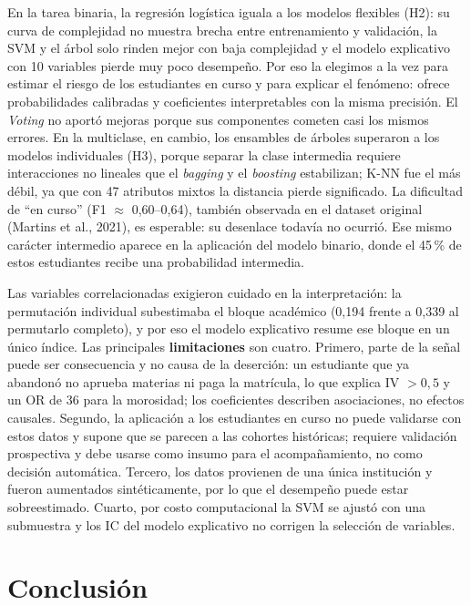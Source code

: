 \documentclass[titlepage,a4paper]{article}
\begin{document}
En la tarea binaria, la regresión logística iguala a los modelos flexibles (H2): su curva de complejidad no muestra brecha entre entrenamiento y validación, la SVM y el árbol solo rinden mejor con baja complejidad y el modelo explicativo con 10 variables pierde muy poco desempeño. Por eso la elegimos a la vez para estimar el riesgo de los estudiantes en curso y para explicar el fenómeno: ofrece probabilidades calibradas y coeficientes interpretables con la misma precisión. El \textit{Voting} no aportó mejoras porque sus componentes cometen casi los mismos errores. En la multiclase, en cambio, los ensambles de árboles superaron a los modelos individuales (H3), porque separar la clase intermedia requiere interacciones no lineales que el \textit{bagging} y el \textit{boosting} estabilizan; K-NN fue el más débil, ya que con 47 atributos mixtos la distancia pierde significado. La dificultad de ``en curso'' (F1 $\approx$ 0,60--0,64), también observada en el dataset original (Martins et al., 2021), es esperable: su desenlace todavía no ocurrió. Ese mismo carácter intermedio aparece en la aplicación del modelo binario, donde el 45\,\% de estos estudiantes recibe una probabilidad intermedia.

Las variables correlacionadas exigieron cuidado en la interpretación: la permutación individual subestimaba el bloque académico (0,194 frente a 0,339 al permutarlo completo), y por eso el modelo explicativo resume ese bloque en un único índice. Las principales \textbf{limitaciones} son cuatro. Primero, parte de la señal puede ser consecuencia y no causa de la deserción: un estudiante que ya abandonó no aprueba materias ni paga la matrícula, lo que explica IV $> 0{,}5$ y un OR de 36 para la morosidad; los coeficientes describen asociaciones, no efectos causales. Segundo, la aplicación a los estudiantes en curso no puede validarse con estos datos y supone que se parecen a las cohortes históricas; requiere validación prospectiva y debe usarse como insumo para el acompañamiento, no como decisión automática. Tercero, los datos provienen de una única institución y fueron aumentados sintéticamente, por lo que el desempeño puede estar sobreestimado. Cuarto, por costo computacional la SVM se ajustó con una submuestra y los IC del modelo explicativo no corrigen la selección de variables.

\section{Conclusión}\label{sec:conclusion}
\end{document}
